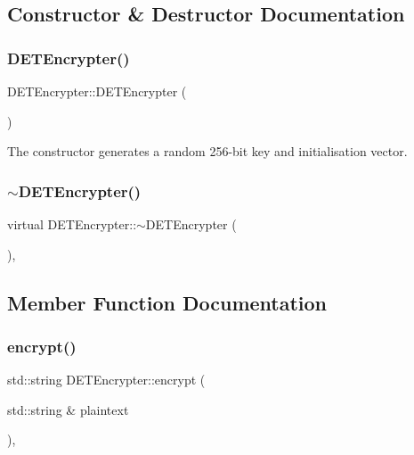 \subsection{Constructor \& Destructor Documentation}
\mbox{\label{classDETEncrypter_a11abdce8bc5cda79b1d3f20b940a99d1}} 
\subsubsection{\texorpdfstring{D\+E\+T\+Encrypter()}{DETEncrypter()}}
{\footnotesize\ttfamily D\+E\+T\+Encrypter\+::\+D\+E\+T\+Encrypter (\begin{DoxyParamCaption}{ }\end{DoxyParamCaption})}

The constructor generates a random 256-\/bit key and initialisation vector. \mbox{\label{classDETEncrypter_a517bdbe6dfd178ebb66405faa9cfca55}} 
\subsubsection{\texorpdfstring{$\sim$\+D\+E\+T\+Encrypter()}{~DETEncrypter()}}
{\footnotesize\ttfamily virtual D\+E\+T\+Encrypter\+::$\sim$\+D\+E\+T\+Encrypter (\begin{DoxyParamCaption}{ }\end{DoxyParamCaption})\hspace{0.3cm}{\ttfamily [inline]}, {\ttfamily [virtual]}}



\subsection{Member Function Documentation}
\mbox{\label{classDETEncrypter_a9d628bff7fe333ece3c39f3827727582}} 
\subsubsection{\texorpdfstring{encrypt()}{encrypt()}\hspace{0.1cm}{\footnotesize\ttfamily [1/2]}}
{\footnotesize\ttfamily std\+::string D\+E\+T\+Encrypter\+::encrypt (\begin{DoxyParamCaption}\item[{std\+::string \&}]{plaintext }\end{DoxyParamCaption})\hspace{0.3cm}{\ttfamily [override]}, {\ttfamily [virtual]}}

